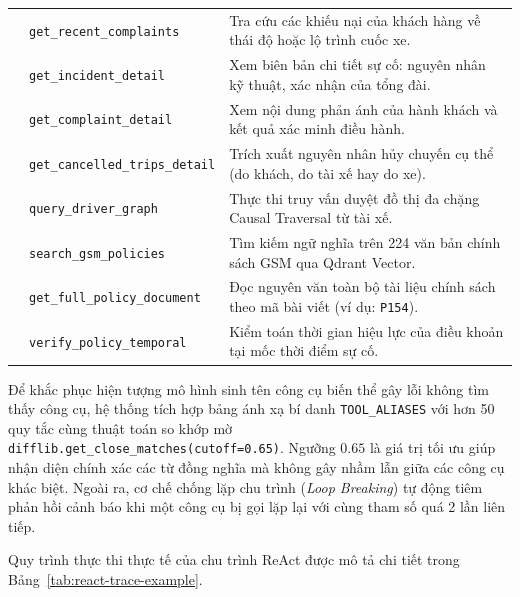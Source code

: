 \documentclass[a4paper,11pt]{article}
\begin{document}
\begin{table}[htbp]
\begin{tabularx}{\textwidth}{>{\raggedright\arraybackslash}p{2.6cm}>{\raggedright\arraybackslash}p{3.8cm}>{\raggedright\arraybackslash}X}
& \nolinkurl{get_recent_complaints} & Tra cứu các khiếu nại của khách hàng về thái độ hoặc lộ trình cuốc xe. \\
& \nolinkurl{get_incident_detail} & Xem biên bản chi tiết sự cố: nguyên nhân kỹ thuật, xác nhận của tổng đài. \\
& \nolinkurl{get_complaint_detail} & Xem nội dung phản ánh của hành khách và kết quả xác minh điều hành. \\
& \nolinkurl{get_cancelled_trips_detail} & Trích xuất nguyên nhân hủy chuyến cụ thể (do khách, do tài xế hay do xe). \\
\midrule
\multirow{4}{2.6cm}{\textbf{Nhóm 4: Đồ thị \& Quy chế}} 
& \nolinkurl{query_driver_graph} & Thực thi truy vấn duyệt đồ thị đa chặng Causal Traversal từ tài xế. \\
& \nolinkurl{search_gsm_policies} & Tìm kiếm ngữ nghĩa trên 224 văn bản chính sách GSM qua Qdrant Vector. \\
& \nolinkurl{get_full_policy_document} & Đọc nguyên văn toàn bộ tài liệu chính sách theo mã bài viết (ví dụ: \texttt{P154}). \\
& \nolinkurl{verify_policy_temporal} & Kiểm toán thời gian hiệu lực của điều khoản tại mốc thời điểm sự cố. \\
\bottomrule
\end{tabularx}
\end{table}

Để khắc phục hiện tượng mô hình sinh tên công cụ biến thể gây lỗi không tìm thấy công cụ, hệ thống tích hợp bảng ánh xạ bí danh \texttt{TOOL\_ALIASES} với hơn 50 quy tắc cùng thuật toán so khớp mờ \nolinkurl{difflib.get_close_matches(cutoff=0.65)}. Ngưỡng $0.65$ là giá trị tối ưu giúp nhận diện chính xác các từ đồng nghĩa mà không gây nhầm lẫn giữa các công cụ khác biệt. Ngoài ra, cơ chế chống lặp chu trình (\textit{Loop Breaking}) tự động tiêm phản hồi cảnh báo khi một công cụ bị gọi lặp lại với cùng tham số quá 2 lần liên tiếp.

Quy trình thực thi thực tế của chu trình ReAct được mô tả chi tiết trong Bảng~\ref{tab:react-trace-example}.
\end{document}
